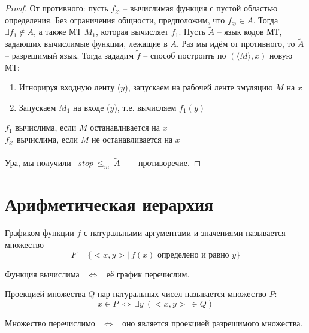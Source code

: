 \documentclass[11pt]{article}
\begin{document}
\begin{proof}
  От противного: пусть $f_{\varnothing}$ -- вычислимая функция с пустой 
  областью определения. Без ограничения общности, предположим, что 
  $f_{\varnothing} \in A$. Тогда $\exists f_1 \notin A$, а также МТ $M_1$, 
  которая вычисляет $f_1$. Пусть $\widetilde{A}$ -- язык кодов МТ, 
  задающих вычислимые функции, лежащие в $A$. Раз мы идём от противного, 
  то $\widetilde{A}$ -- разрешимый язык. Тогда зададим $\widetilde{f}$ --
  способ построить по $(\langle M \rangle, x)$ новую МТ:
  \begin{enumerate}
    \item Игнорируя входную ленту ($y$), запускаем на рабочей ленте 
    эмуляцию $M$ на $x$
    \item Запускаем $M_1$ на входе ($y$), т.е. вычисляем $f_1(y)$
  \end{enumerate}
  $f_1$ вычислима, если $M$ останавливается на $x$ \\
  $f_{\varnothing}$ вычислима, если $M$ не останавливается на $x$ \\ \\
  Ура, мы получили \ $stop \ \leq_m \ \widetilde{A}$ \ -- \  противоречие.
\end{proof}

\section{Арифметическая иерархия}

\begin{definition}
  Графиком функции $f$ с натуральными аргументами и значениями называется
  множество
  \[F = \{<x, y> | \ f(x) \text{ определено и равно } y\}\]
\end{definition}

\begin{lemma}
  Функция вычислима \ $\Longleftrightarrow$ \ её график перечислим.
\end{lemma}

\begin{definition}
  Проекцией множества $Q$ пар натуральных чисел называется множество $P$:
  \[x \in P \ \Longleftrightarrow \ \exists y \ (<x, y> \ \in Q)\]
\end{definition}

\begin{lemma}
  Множество перечислимо \ $\Longleftrightarrow$ \ оно является проекцией 
  разрешимого множества.
\end{lemma}
\end{document}
